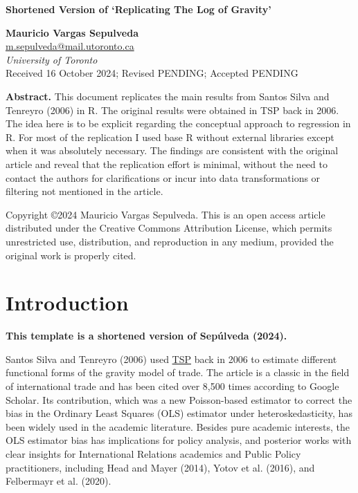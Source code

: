 \documentclass[letterpaper,twoside,12pt]{article}
\begin{document}
\thispagestyle{firstpagefooter}

\begingroup  
\LARGE{\textbf{Shortened Version of `Replicating The Log of
Gravity'}}\normalsize

\bigskip

  \textbf{Mauricio Vargas Sepulveda} \\
  \href{mailto:m.sepulveda@mail.utoronto.ca}{m.sepulveda@mail.utoronto.ca} \\
  \textit{University of Toronto}\\

Received 16 October 2024; Revised PENDING; Accepted PENDING

\bigskip

\textbf{Abstract.} This document replicates the main results from Santos
Silva and Tenreyro (2006) in R. The original results were obtained in
TSP back in 2006. The idea here is to be explicit regarding the
conceptual approach to regression in R. For most of the replication I
used base R without external libraries except when it was absolutely
necessary. The findings are consistent with the original article and
reveal that the replication effort is minimal, without the need to
contact the authors for clarifications or incur into data
transformations or filtering not mentioned in the article.

Copyright \copyright 2024 Mauricio Vargas Sepulveda. This is an open
access article distributed under the Creative Commons Attribution
License, which permits unrestricted use, distribution, and reproduction
in any medium, provided the original work is properly cited.
\endgroup

\section{Introduction}\label{introduction}

\textbf{This template is a shortened version of Sepúlveda (2024).}

Santos Silva and Tenreyro (2006) used
\href{https://en.wikipedia.org/wiki/TSP_(econometrics_software)}{TSP}
back in 2006 to estimate different functional forms of the gravity model
of trade. The article is a classic in the field of international trade
and has been cited over 8,500 times according to Google Scholar. Its
contribution, which was a new Poisson-based estimator to correct the
bias in the Ordinary Least Squares (OLS) estimator under
heteroskedasticity, has been widely used in the academic literature.
Besides pure academic interests, the OLS estimator bias has implications
for policy analysis, and posterior works with clear insights for
International Relations academics and Public Policy practitioners,
including Head and Mayer (2014), Yotov et al. (2016), and Felbermayr et
al. (2020).
\end{document}
